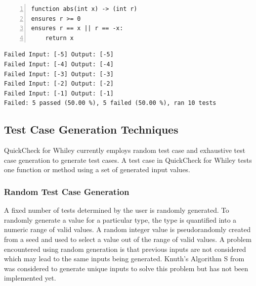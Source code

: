 \begin{lstlisting}[language=Whiley, tabsize=3, numbers=left,
label={lst:whileyAbs}, caption={Whiley program for an incorrect implementation of the abs function},
captionpos=b]
function abs(int x) -> (int r)
ensures r >= 0
ensures r == x || r == -x:
	return x
\end{lstlisting}

\begin{lstlisting}[label={lst:whileyQCResults},
caption={Results of executing the tool on Listing \ref{lst:whileyAbs}},
captionpos=b, frame=single ]
Failed Input: [-5] Output: [-5]
Failed Input: [-4] Output: [-4]
Failed Input: [-3] Output: [-3]
Failed Input: [-2] Output: [-2]
Failed Input: [-1] Output: [-1]
Failed: 5 passed (50.00 %), 5 failed (50.00 %), ran 10 tests
\end{lstlisting}

\subsection{Test Case Generation Techniques}

QuickCheck for Whiley currently employs random test case and exhaustive test case generation to generate test cases. A test case in QuickCheck for Whiley tests one function or method using a set of generated input values.

\subsubsection{Random Test Case Generation}

A fixed number of tests determined by the user is randomly generated.
To randomly generate a value for a particular type, the type is quantified into a numeric range of valid values. 
A random integer value is pseudorandomly created from a seed and used to select a value out of the range of valid values.
A problem encountered using random generation is that previous inputs are not considered which may lead to the same inputs being generated.
Knuth's Algorithm S from \cite{artProgv2} was considered to generate unique inputs to solve this problem but has not been implemented yet.

